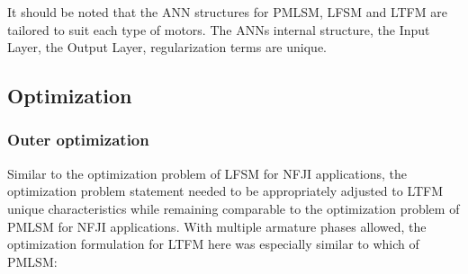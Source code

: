             It should be noted that the \acs{ANN} structures for \acs{PMLSM}, \acs{LFSM} and \acs{LTFM} are tailored to suit each type of motors. The \acsp{ANN} internal structure, the Input Layer, the Output Layer, regularization terms are unique. 
        
        
        \subsection{Optimization}                   \label{Chapter:RSM/LTFM/Optimization}
        
        
            \subsubsection{Outer optimization}         \label{Chapter:RSM/LTFM/Optimization/Outer}
    
            
                Similar to the optimization problem of \acs{LFSM} for \acs{NFJI} applications, the optimization problem statement needed to be appropriately adjusted to \acs{LTFM} unique characteristics while remaining comparable to the optimization problem of \acs{PMLSM} for \acs{NFJI} applications. With multiple armature phases allowed, the optimization formulation for \acs{LTFM} here was especially similar to which of \acs{PMLSM}:
                

